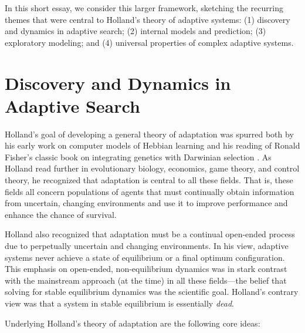 \documentclass{sig-alternate}
\begin{document}
In this short essay, we consider this larger framework, sketching the
recurring themes that were central to Holland's theory of
adaptive systems: (1) discovery and 
dynamics in adaptive search; (2) internal models and prediction; (3) 
exploratory modeling; and (4) universal properties of complex adaptive systems.  

\section{Discovery and Dynamics in Adaptive Search} 

Holland's goal of developing a general theory of adaptation was
spurred both by his early work on computer models of Hebbian learning
\cite{Rochester1956} and his reading of Ronald Fisher's classic book
on integrating genetics with Darwinian selection \cite{Fisher1930}.
As Holland read further in evolutionary biology,
economics, game theory, and control theory, he recognized that
adaptation is central to all these fields.  That is,
these fields all concern populations of agents that must continually
obtain information from uncertain, changing environments and use it 
to improve performance and enhance the chance of survival. 

Holland also recognized that adaptation must be a continual
open-ended process due to perpetually uncertain and changing
environments.  In his view, adaptive systems never achieve a state of
equilibrium or a final optimum configuration.  This emphasis on
open-ended, non-equilibrium dynamics was in stark contrast with the
mainstream approach (at the time) in all these fields---the belief
that solving for stable equilibrium dynamics was the scientific goal.
Holland's contrary view was that a system in stable equilibrium is
essentially \emph{dead}.

Underlying Holland's theory of adaptation are the following core ideas:  
\end{document}
